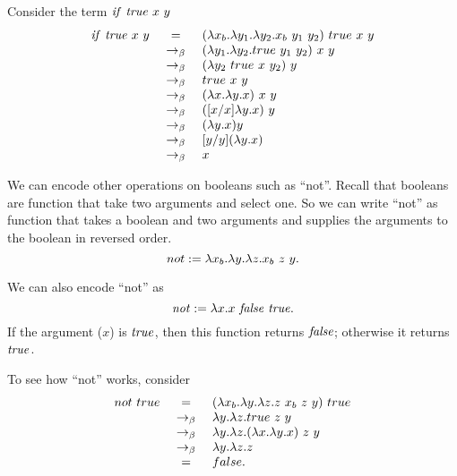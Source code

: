 \begin{example}
\label{xmpl:lcc::bools::encoding}
 Consider the term $\mathit{if}~\mathit{true}~ x~ y$
\[
\begin{array}{rcl}
\mathit{if}~ \mathit{true}~ x~ y & =     & (\lambda x_b. \lambda y_1. \lambda y_2. x_b~ y_1~ y_2)~ true~ x~ y \\
              & ~\rightarrow_{\beta}~ &  (\lambda y_1. \lambda y_2. true~ y_1~ y_2)~ x~ y \\
              & ~\rightarrow_{\beta}~ & (\lambda y_2~ true~ x~ y_2)~ y \\
              & ~\rightarrow_{\beta}~ & true~ x~ y \\
              & ~\rightarrow_{\beta}~ & (\lambda x. \lambda y. x)~ x~ y \\
              & ~\rightarrow_{\beta}~ & ([x/x] \lambda y. x)~  y\\
              & ~\rightarrow_{\beta}~ & (\lambda y. x) y \\
              & ~\rightarrow_{\beta}~ & [y/y](\lambda y. x) \\
              & ~\rightarrow_{\beta}~ & x\\
\end{array}
\]
\end{example}


\begin{gram}
\label{grm:lcc::bools::not}
We can encode other operations on booleans such as ``not''.
%
Recall that booleans are function that take
two arguments and select one.  So we can write ``not'' as function
that takes a boolean and two arguments and supplies the arguments to
the boolean in reversed order. 
\[
not := \lambda x_b. \lambda y. \lambda z. x_b~z~y.
\]

We can also encode ``not'' as 
\[
\mathit{not} := \lambda x. x~\mathit{false}~\mathit{true}.
\]
If the argument ($x$) is $\mathit{true}$, then this function returns
$\mathit{false}$; otherwise it returns $\mathit{true}$.
\end{gram}

\begin{example}
\label{xmpl:lcc::bools::not}
To see how ``not'' works, consider
\[
\begin{array}{rcl}
not~true & = & (\lambda x_b. \lambda y. \lambda z.z~x_b~z~y)~true\\
        & ~\rightarrow_{\beta}~ & \lambda y. \lambda z. true~z~y\\
        & ~\rightarrow_{\beta}~ & \lambda y. \lambda z. (\lambda x. \lambda y. x)~z~y\\
        & ~\rightarrow_{\beta}~ & \lambda y. \lambda z.z\\
        & = & false.
\end{array}
\]
\end{example}


